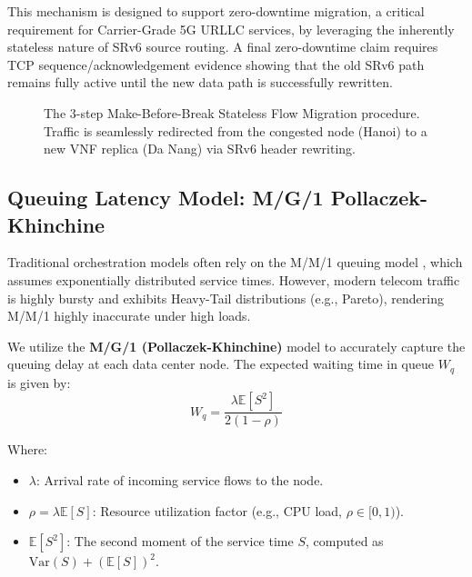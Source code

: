 \documentclass[12pt, a4paper, reqno, oneside]{book}
\begin{document}
This mechanism is designed to support zero-downtime migration, a critical requirement for Carrier-Grade 5G URLLC services, by leveraging the inherently stateless nature of SRv6 source routing. A final zero-downtime claim requires TCP sequence/acknowledgement evidence showing that the old SRv6 path remains fully active until the new data path is successfully rewritten.

\begin{figure}[H]
    \centering
    \vspace{6cm}
    \caption{The 3-step Make-Before-Break Stateless Flow Migration procedure. Traffic is seamlessly redirected from the congested node (Hanoi) to a new VNF replica (Da Nang) via SRv6 header rewriting.}
    \label{fig:make_before_break}
\end{figure}

\subsection{Queuing Latency Model: M/G/1 Pollaczek-Khinchine}
Traditional orchestration models often rely on the M/M/1 queuing model \cite{bertsekas1992data}, which assumes exponentially distributed service times. However, modern telecom traffic is highly bursty and exhibits Heavy-Tail distributions (e.g., Pareto), rendering M/M/1 highly inaccurate under high loads.

We utilize the \textbf{M/G/1 (Pollaczek-Khinchine)} model to accurately capture the queuing delay at each data center node. The expected waiting time in queue $W_q$ is given by:
\begin{equation}
W_q = \frac{\lambda \mathbb{E}[S^2]}{2(1-\rho)}
\label{eq:mg1}
\end{equation}

Where:
\begin{itemize}
    \item $\lambda$: Arrival rate of incoming service flows to the node.
    \item $\rho = \lambda \mathbb{E}[S]$: Resource utilization factor (e.g., CPU load, $\rho \in [0,1)$).
    \item $\mathbb{E}[S^2]$: The second moment of the service time $S$, computed as $\text{Var}(S) + (\mathbb{E}[S])^2$.
\end{itemize}
\end{document}
